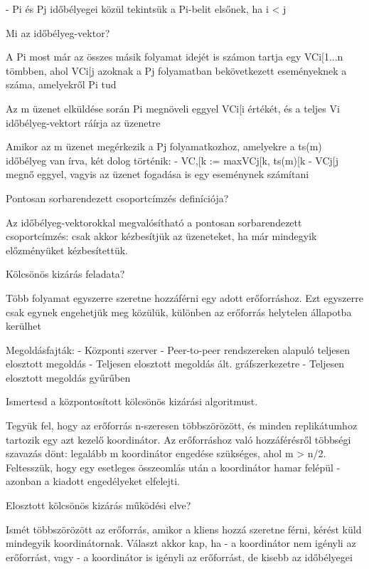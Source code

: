 \documentclass[12pt]{article}
\begin{document}
\begin{description}
        - Pi és Pj időbélyegei közül tekintsük a Pi-belit elsőnek, ha i < j
    \item  Mi az időbélyeg-vektor?
    \item A Pi most már az összes másik folyamat idejét is számon tartja egy VCi[1...n tömbben,
        ahol VCi[j azoknak a Pj folyamatban bekövetkezett eseményeknek a száma, amelyekről Pi tud
    \item Az m üzenet elküldése során Pi megnöveli eggyel  VCi[i értékét, és a teljes Vi időbélyeg-vektort ráírja az üzenetre
    \item Amikor az m üzenet megérkezik a Pj folyamatkozhoz, amelyekre a ts(m) időbélyeg van írva, két dolog történik:
        - VC,[k := max{VCj[k, ts(m)[k}
        - VCj[j megnő eggyel, vagyis az üzenet fogadása is egy eseménynek számítani
    \item  Pontosan sorbarendezett csoportcímzés definíciója?
    \item Az időbélyeg-vektorokkal megvalósítható a pontosan sorbarendezett csoportcímzés: csak akkor kézbesítjük az üzeneteket,
        ha már mindegyik előzményüket kézbesítettük.
    \item  Kölcsönös kizárás feladata?
    \item Több folyamat egyszerre szeretne hozzáférni egy adott erőforráshoz. Ezt egyszerre csak egynek engehetjük meg közülük,
        különben az erőforrás helytelen állapotba kerülhet
    \item Megoldásfajták: 
        - Központi szerver
        - Peer-to-peer rendszereken alapuló teljesen elosztott megoldás
        - Teljesen elosztott megoldás ált. gráfszerkezetre
        - Teljesen elosztott megoldás gyűrűben
    \item  Ismertesd a központosított kölcsönös kizárási algoritmust.
    \item Tegyük fel, hogy az erőforrás n-szeresen többszörözött, és minden replikátumhoz tartozik egy azt kezelő koordinátor.
        Az erőforráshoz való hozzáférésről többségi szavazás dönt: legalább m koordinátor engedése szükséges, ahol m > n/2.
        Feltesszük, hogy egy esetleges összeomlás után a koordinátor hamar felépül - azonban a kiadott engedélyeket elfelejti.
    \item  Elosztott kölcsönös kizárás működési elve?
    \item Ismét többszörözött az erőforrás, amikor a kliens hozzá szeretne férni, kérést küld mindegyik koordinátornak. Választ akkor kap, ha
        - a koordinátor nem igényli az erőforrást, vagy
        - a koordinátor is igényli az erőforrást, de kisebb az időbélyegei

\end{description}
\end{document}
